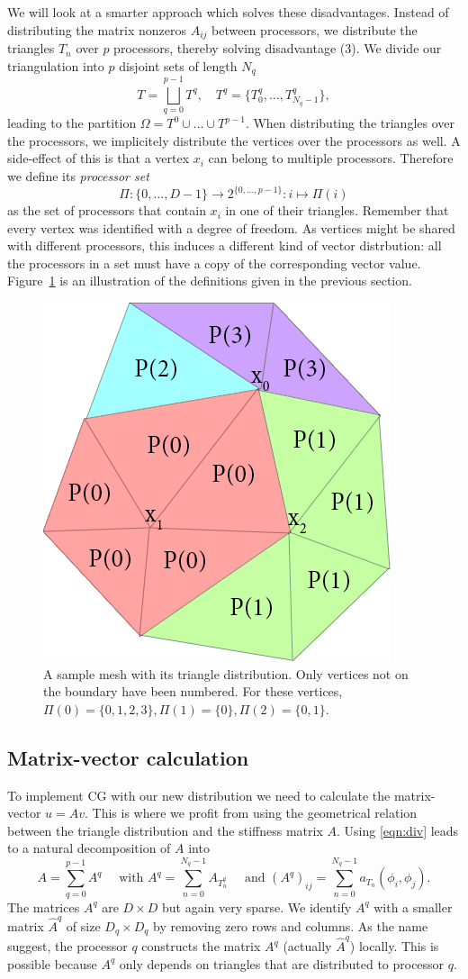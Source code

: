 \documentclass[11pt]{amsart}
\theoremstyle{definition}
\begin{document}
We will look at a smarter approach which solves these disadvantages. Instead of distributing the matrix nonzeros $A_{ij}$ between processors, we distribute the triangles $T_n$ over $p$ processors, thereby solving disadvantage (3). We divide our triangulation into $p$ disjoint sets of length $N_q$
\[
  T = \bigsqcup_{q=0}^{p-1} T^q, \quad T^q = \{ T^q_0, \ldots, T^q_{N_q-1} \},
\]
leading to the partition $\Omega = T^0 \cup \dots \cup T^{p-1}$. When distributing the triangles over the processors, we implicitely distribute the vertices over the processors as well.  A side-effect of this is that a vertex $x_i$ can belong to multiple processors. Therefore we define its \emph{processor set} 
\[
  \Pi: \{0, \ldots, D-1\} \to 2^{\{0, \ldots, p-1\}}: i \mapsto \Pi(i)
\]
as the set of processors that contain $x_i$ in one of their triangles. Remember that every vertex was identified with a degree of freedom. As vertices might be shared with different processors, this induces a different kind of vector distrbution: all the processors in a set must have a copy of the corresponding vector value.
Figure~\ref{fig:procset} is an illustration of the definitions given in the previous section. 

\begin{figure}[h!]
  \includegraphics[width=0.5\linewidth]{procset.png}
  \caption{A sample mesh with its triangle distribution. Only vertices not on the boundary have been numbered. For these vertices, $\Pi(0) = \{0, 1, 2, 3\}, \Pi(1) = \{0\}, \Pi(2) = \{0, 1\}$.}
  \label{fig:procset}
\end{figure}
\subsection{Matrix-vector calculation}
To implement CG with our new distribution we need to calculate the matrix-vector $u = Av$. This is where we profit from using the geometrical relation between the triangle distribution and the stiffness matrix $A$. Using \eqref{eqn:div} leads to a natural decomposition of $A$ into
\[
	A = \sum_{q=0}^{p-1} A^q\quad \text{ with } A^q= \sum_{n=0}^{N_q-1} A_{T^q_n} \quad \text{ and } (A^q)_{ij} = \sum_{n=0}^{N_q-1} a_{T_n}(\phi_i,\phi_j).
\]
The matrices $A^q$ are $D \times D$ but again very sparse. We identify $A^q$ with a smaller matrix $\hat A^q$ of size $D_q \times D_q$ by removing zero rows and columns. As the name suggest, the processor $q$ constructs the matrix $A^q$ (actually $\hat A^q$) locally. This is possible because $A^q$ only depends on triangles that are distributed to processor $q$.
\end{document}
